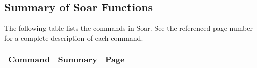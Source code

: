 \newpage
\newpage
\subsection*{Summary of Soar Functions}

The following table lists the commands in Soar. See the referenced page number
for a complete description of each command.

\begin{small}
\begin{longtable}{ l p{8cm} r }
Command  & Summary & Page \\  \hline

\end{longtable}
\end{small}



